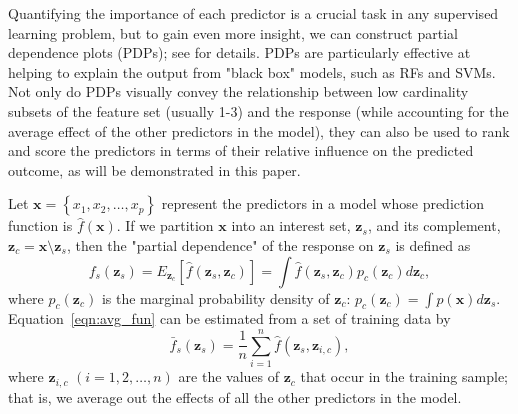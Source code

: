 \documentclass[12pt]{article}
\begin{document}
Quantifying the importance of each predictor is a crucial task in any supervised learning problem, but to gain even more insight, we can construct partial dependence plots (PDPs); see \citet{friedman-2001-greedy} for details. PDPs are particularly effective at helping to explain the output from "black box" models, such as RFs and SVMs. Not only do PDPs visually convey the relationship between low cardinality subsets of the feature set (usually 1-3) and the response (while accounting for the average effect of the other predictors in the model), they can also be used to rank and score the predictors in terms of their relative influence on the predicted outcome, as will be demonstrated in this paper. 

Let $\boldsymbol{x} = \left\{x_1, x_2, \dots, x_p\right\}$ represent the predictors in a model whose prediction function is $\widehat{f}\left(\boldsymbol{x}\right)$. If we partition $\boldsymbol{x}$ into an interest set, $\boldsymbol{z}_s$, and its complement, $\boldsymbol{z}_c = \boldsymbol{x} \setminus \boldsymbol{z}_s$, then the "partial dependence" of the response on $\boldsymbol{z}_s$ is defined as
\begin{equation}
\label{eqn:avg_fun}
  f_s\left(\boldsymbol{z}_s\right) = E_{\boldsymbol{z}_c}\left[\widehat{f}\left(\boldsymbol{z}_s, \boldsymbol{z}_c\right)\right] = \int \widehat{f}\left(\boldsymbol{z}_s, \boldsymbol{z}_c\right)p_{c}\left(\boldsymbol{z}_c\right)d\boldsymbol{z}_c,
\end{equation}
where $p_{c}\left(\boldsymbol{z}_c\right)$ is the marginal probability density of $\boldsymbol{z}_c$: $p_{c}\left(\boldsymbol{z}_c\right) = \int p\left(\boldsymbol{x}\right)d\boldsymbol{z}_s$.
Equation~\eqref{eqn:avg_fun} can be estimated from a set of training data by
\begin{equation}
\label{eqn:pdf}
\bar{f}_s\left(\boldsymbol{z}_s\right) = \frac{1}{n}\sum_{i = 1}^n\widehat{f}\left(\boldsymbol{z}_s,\boldsymbol{z}_{i, c}\right),
\end{equation}
where $\boldsymbol{z}_{i, c}$ $\left(i = 1, 2, \dots, n\right)$ are the values of $\boldsymbol{z}_c$ that occur in the training sample; that is, we average out the effects of all the other predictors in the model.
\end{document}
